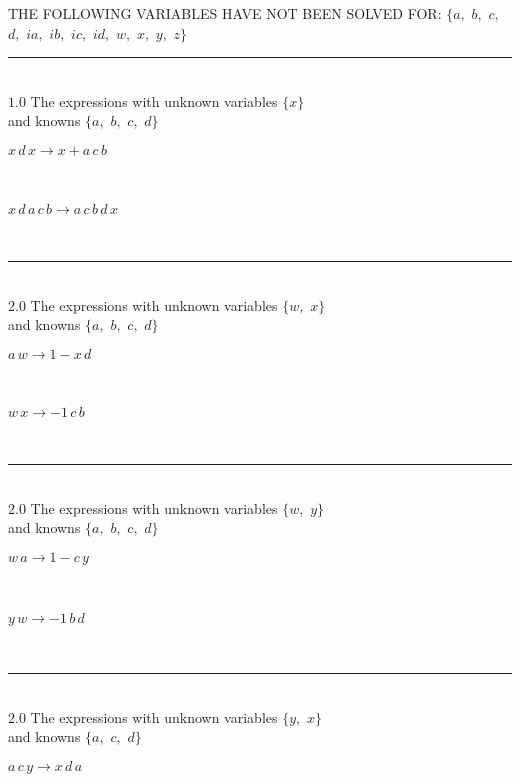\documentclass[rep10,leqno]{report}
\begin{document}
THE FOLLOWING VARIABLES HAVE NOT BEEN SOLVED FOR:\hfil\break
$\{a,
$ $
b,
$ $
c,
$ $
d,
$ $
ia,
$ $
ib,
$ $
ic,
$ $
id,
$ $
w,
$ $
x,
$ $
y,
$ $
z\}$
\smallskip\\
\rule[3pt]{6in}{.7pt}\\
$1.0$  The expressions with unknown variables $\{x\}$\\
and knowns $\{a,
$ $
b,
$ $
c,
$ $
d\}$\smallskip\\
\begin{minipage}{6in}
$
x\,
 d\,
 x\rightarrow x + a\,
 c\,
 b
$
\end{minipage}\medskip \\
\begin{minipage}{6in}
$
x\,
 d\,
 a\,
 c\,
 b\rightarrow a\,
 c\,
 b\,
 d\,
 x
$
\end{minipage}\\
\rule[3pt]{6in}{.7pt}\\
$2.0$  The expressions with unknown variables $\{w,
$ $
x\}$\\
and knowns $\{a,
$ $
b,
$ $
c,
$ $
d\}$\smallskip\\
\begin{minipage}{6in}
$
a\,
 w\rightarrow 1 - x\,
 d
$
\end{minipage}\medskip \\
\begin{minipage}{6in}
$
w\,
 x\rightarrow -1\,
 c\,
 b
$
\end{minipage}\\
\rule[3pt]{6in}{.7pt}\\
$2.0$  The expressions with unknown variables $\{w,
$ $
y\}$\\
and knowns $\{a,
$ $
b,
$ $
c,
$ $
d\}$\smallskip\\
\begin{minipage}{6in}
$
w\,
 a\rightarrow 1 - c\,
 y
$
\end{minipage}\medskip \\
\begin{minipage}{6in}
$
y\,
 w\rightarrow -1\,
 b\,
 d
$
\end{minipage}\\
\rule[3pt]{6in}{.7pt}\\
$2.0$  The expressions with unknown variables $\{y,
$ $
x\}$\\
and knowns $\{a,
$ $
c,
$ $
d\}$\smallskip\\
\begin{minipage}{6in}
$
a\,
 c\,
 y\rightarrow x\,
 d\,
 a
$
\end{minipage}\\
\end{document}
